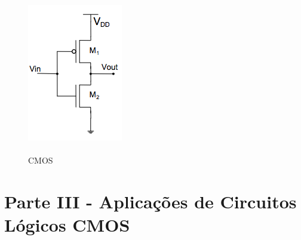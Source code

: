 \documentclass[pdftex,12pt,a4paper]{report}
\begin{document}
\begin{figure}[!htb]
  \includegraphics[width=\linewidth]{Imagens/CMOS.png}
  \caption{\\CMOS}\label{fig:fig_cmos}
\endminipage\hfill
\end{figure}

\section{Parte III - Aplicações	de	Circuitos	Lógicos	CMOS}
\end{document}
